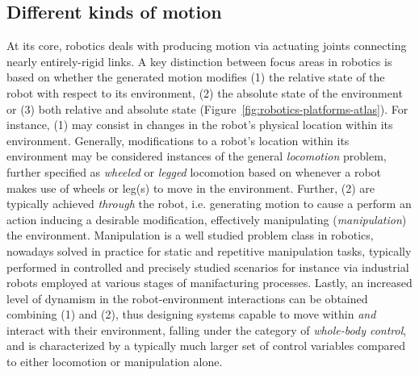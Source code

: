 \subsection{Different kinds of motion} 
At its core, robotics deals with producing motion via actuating joints connecting nearly entirely-rigid links. 
A key distinction between focus areas in robotics is based on whether the generated motion modifies (1) the relative state of the robot with respect to its environment, (2) the absolute state of the environment or (3) both relative and absolute state (Figure~\ref{fig:robotics-platforms-atlas}).
For instance, (1) may consist in changes in the robot's physical location within its environment. 
Generally, modifications to a robot's location within its environment may be considered instances of the general \emph{locomotion} problem, further specified as \emph{wheeled} or \emph{legged} locomotion based on whenever a robot makes use of wheels or leg(s) to move in the environment.
Further, (2) are typically achieved \emph{through} the robot, i.e. generating motion to cause a perform an action inducing a desirable modification, effectively manipulating (\emph{manipulation}) the environment. 
Manipulation is a well studied problem class in robotics, nowadays solved in practice for static and repetitive manipulation tasks, typically performed in controlled and precisely studied scenarios for instance via industrial robots employed at various stages of manifacturing processes.
Lastly, an increased level of dynamism in the robot-environment interactions can be obtained combining (1) and (2), thus designing systems capable to move within \emph{and} interact with their environment, falling under the category of \emph{whole-body control}, and is characterized by a typically much larger set of control variables compared to either locomotion or manipulation alone.

